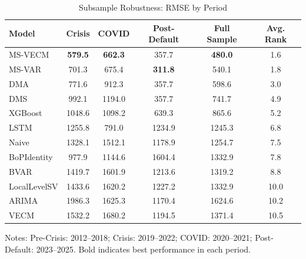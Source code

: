 \begin{table}[htbp]
\centering
\small
\caption{Subsample Robustness: RMSE by Period}
\label{tab:subsample}
\begin{tabular}{lccccc}
\toprule
Model & Crisis & COVID & Post-Default & Full Sample & Avg. Rank \\
\midrule
MS-VECM & \textbf{579.5} & \textbf{662.3} & 357.7 & \textbf{480.0} & 1.6 \\
MS-VAR & 701.3 & 675.4 & \textbf{311.8} & 540.1 & 1.8 \\
DMA & 771.6 & 912.3 & 357.7 & 598.6 & 3.0 \\
DMS & 992.1 & 1194.0 & 357.7 & 741.7 & 4.9 \\
XGBoost & 1048.6 & 1098.2 & 639.3 & 865.6 & 5.2 \\
LSTM & 1255.8 & 791.0 & 1234.9 & 1245.3 & 6.8 \\
Naive & 1328.1 & 1512.1 & 1178.9 & 1254.7 & 7.5 \\
BoPIdentity & 977.9 & 1144.6 & 1604.4 & 1332.9 & 7.8 \\
BVAR & 1419.7 & 1601.9 & 1213.6 & 1319.2 & 8.8 \\
LocalLevelSV & 1433.6 & 1620.2 & 1227.2 & 1332.9 & 10.0 \\
ARIMA & 1986.3 & 1625.3 & 1170.4 & 1624.6 & 10.2 \\
VECM & 1532.2 & 1680.2 & 1194.5 & 1371.4 & 10.5 \\
\bottomrule
\end{tabular}
\begin{tablenotes}
\small
\item Notes: Pre-Crisis: 2012--2018; Crisis: 2019--2022; 
COVID: 2020--2021; Post-Default: 2023--2025. 
Bold indicates best performance in each period.
\end{tablenotes}
\end{table}